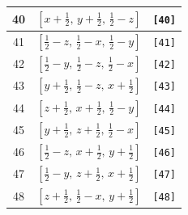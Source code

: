 \documentclass[fleqn,8pt]{jsarticle}
\begin{document}
\begin{longtable}{ccc}
40 & $\left[ x + \frac{1}{2},\, y + \frac{1}{2},\, \frac{1}{2} - z \right]$ & {\tt [40]} \\ \hline
41 & $\left[ \frac{1}{2} - z,\, \frac{1}{2} - x,\, \frac{1}{2} - y \right]$ & {\tt [41]} \\ \hline
42 & $\left[ \frac{1}{2} - y,\, \frac{1}{2} - z,\, \frac{1}{2} - x \right]$ & {\tt [42]} \\ \hline
43 & $\left[ y + \frac{1}{2},\, \frac{1}{2} - z,\, x + \frac{1}{2} \right]$ & {\tt [43]} \\ \hline
44 & $\left[ z + \frac{1}{2},\, x + \frac{1}{2},\, \frac{1}{2} - y \right]$ & {\tt [44]} \\ \hline
45 & $\left[ y + \frac{1}{2},\, z + \frac{1}{2},\, \frac{1}{2} - x \right]$ & {\tt [45]} \\ \hline
46 & $\left[ \frac{1}{2} - z,\, x + \frac{1}{2},\, y + \frac{1}{2} \right]$ & {\tt [46]} \\ \hline
47 & $\left[ \frac{1}{2} - y,\, z + \frac{1}{2},\, x + \frac{1}{2} \right]$ & {\tt [47]} \\ \hline
48 & $\left[ z + \frac{1}{2},\, \frac{1}{2} - x,\, y + \frac{1}{2} \right]$ & {\tt [48]} \\
\end{longtable}
\end{document}
